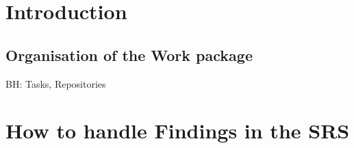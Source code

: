 \documentclass{template/openetcs_article}
\begin{document}
\section{Introduction}





\subsection{Organisation of the Work package}

BH: Tasks, Repositories





%

\section{How to handle Findings in the SRS}


\nocite{*}
\end{document}
